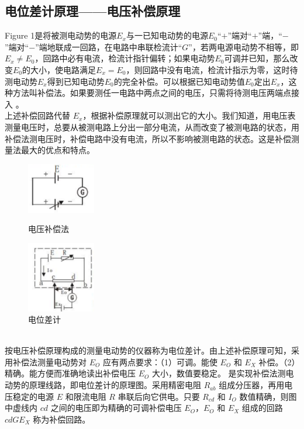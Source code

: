 \documentclass{article}
\begin{document}
\subsection{电位差计原理——电压补偿原理}
\hspace*{2em}Figure 1是将被测电动势的电源\(E_x\)与一已知电动势的电源\(E_0\)“\(+\)”端对“\(+\)”端，“\(-\)”端对“\(-\)”端地联成一回路，在电路中串联检流计“\(G\)”，若两电源电动势不相等，即\(E_x\neq E_0\)，回路中必有电流，检流计指针偏转；如果电动势\(E_0\)可调并已知，那么改变\(E_0\)的大小，使电路满足\(E_x = E_0\)，则回路中没有电流，检流计指示为零，这时待测电动势\(E_x\)得到已知电动势\(E_0\)的完全补偿。可以根据已知电动势值\(E_0\)定出\(E_x\)，这种方法叫补偿法。如果要测任一电路中两点之间的电压，只需将待测电压两端点接入 。\\
\hspace*{2em}上述补偿回路代替 \(E_x\)，根据补偿原理就可以测出它的大小。我们知道，用电压表测量电压时，总要从被测电路上分出一部分电流，从而改变了被测电路的状态，用补偿法测电压时，补偿电路中没有电流，所以不影响被测电路的状态。这是补偿测量法最大的优点和特点。
\begin{figure}[ht]
    \centering
    \begin{minipage}{0.45\textwidth} %
        \centering
        \includegraphics[width=3cm]{2.1.png} %
        \caption{电压补偿法}
    \end{minipage}\hfill
    \begin{minipage}{0.45\textwidth}
        \centering
        \includegraphics[width=3cm]{2.2.png} %
        \caption{电位差计}
    \end{minipage}
\end{figure}\\
\hspace*{2em}按电压补偿原理构成的测量电动势的仪器称为电位差计。由上述补偿原理可知，采用补偿法测量电动势对 \(E_O\) 应有两点要求：（1）可调。能使 \(E_O\) 和 \(E_X\) 补偿。（2）精确。能方便而准确地读出补偿电压 \(E_O\) 大小，数值要稳定。
是实现补偿法测电动势的原理线路，即电位差计的原理图。采用精密电阻 \(R_{ab}\) 组成分压器，再用电压稳定的电源 \(E\) 和限流电阻 \(R\) 串联后向它供电。只要 \(R_{cd}\) 和 \(I_O\) 数值精确，则图中虚线内 \(cd\) 之间的电压即为精确的可调补偿电压 \(E_O\)，\(E_O\) 和 \(E_X\) 组成的回路 \(cdGE_X\) 称为补偿回路。
\end{document}

